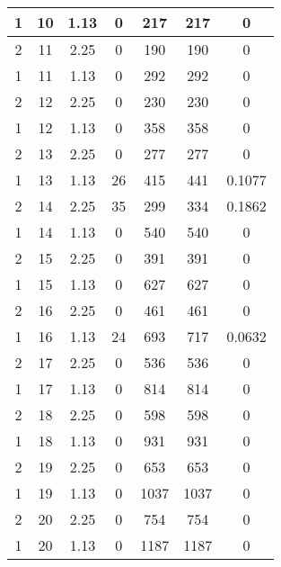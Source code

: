 \documentclass[letterpaper, 12pt]{article}
\begin{document}
\begin{longtable}{|c|c|c|c|c|c|c|}
\hline
1 & 10 & 1.13 & 0 & 217 & 217 & 0 \\
\hline
2 & 11 & 2.25 & 0 & 190 & 190 & 0 \\
\hline
1 & 11 & 1.13 & 0 & 292 & 292 & 0 \\
\hline
2 & 12 & 2.25 & 0 & 230 & 230 & 0 \\
\hline
1 & 12 & 1.13 & 0 & 358 & 358 & 0 \\
\hline
2 & 13 & 2.25 & 0 & 277 & 277 & 0 \\
\hline
1 & 13 & 1.13 & 26 & 415 & 441 & 0.1077 \\
\hline
2 & 14 & 2.25 & 35 & 299 & 334 & 0.1862 \\
\hline
1 & 14 & 1.13 & 0 & 540 & 540 & 0 \\
\hline
2 & 15 & 2.25 & 0 & 391 & 391 & 0 \\
\hline
1 & 15 & 1.13 & 0 & 627 & 627 & 0 \\
\hline
2 & 16 & 2.25 & 0 & 461 & 461 & 0 \\
\hline
1 & 16 & 1.13 & 24 & 693 & 717 & 0.0632 \\
\hline
2 & 17 & 2.25 & 0 & 536 & 536 & 0 \\
\hline
1 & 17 & 1.13 & 0 & 814 & 814 & 0 \\
\hline
2 & 18 & 2.25 & 0 & 598 & 598 & 0 \\
\hline
1 & 18 & 1.13 & 0 & 931 & 931 & 0 \\
\hline
2 & 19 & 2.25 & 0 & 653 & 653 & 0 \\
\hline
1 & 19 & 1.13 & 0 & 1037 & 1037 & 0 \\
\hline
2 & 20 & 2.25 & 0 & 754 & 754 & 0 \\
\hline
1 & 20 & 1.13 & 0 & 1187 & 1187 & 0 \\
\hline
\end{longtable}
\end{document}
